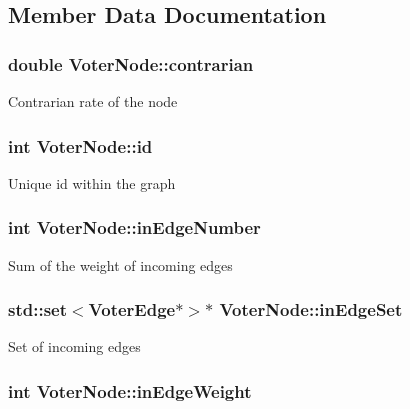 \subsection{Member Data Documentation}
\hypertarget{classVoterNode_ae913afddad8f917f649e406fa1334b25}{
\subsubsection[{contrarian}]{\setlength{\rightskip}{0pt plus 5cm}double Voter\-Node\-::contrarian}}\label{classVoterNode_ae913afddad8f917f649e406fa1334b25}
Contrarian rate of the node \hypertarget{classVoterNode_a93568292fdcb41d849f54f586c598fbc}{
\subsubsection[{id}]{\setlength{\rightskip}{0pt plus 5cm}int Voter\-Node\-::id}}\label{classVoterNode_a93568292fdcb41d849f54f586c598fbc}
Unique id within the graph \hypertarget{classVoterNode_a9bd696aaa21ecf7b01bc877a6eaff534}{
\subsubsection[{in\-Edge\-Number}]{\setlength{\rightskip}{0pt plus 5cm}int Voter\-Node\-::in\-Edge\-Number}}\label{classVoterNode_a9bd696aaa21ecf7b01bc877a6eaff534}
Sum of the weight of incoming edges \hypertarget{classVoterNode_a753832f3c6b57995fce832169250a520}{
\subsubsection[{in\-Edge\-Set}]{\setlength{\rightskip}{0pt plus 5cm}std\-::set$<${\bf Voter\-Edge}$\ast$$>$$\ast$ Voter\-Node\-::in\-Edge\-Set}}\label{classVoterNode_a753832f3c6b57995fce832169250a520}
Set of incoming edges \hypertarget{classVoterNode_a630068d0551e05d9a7bf3eff1f3b1202}{
\subsubsection[{in\-Edge\-Weight}]{\setlength{\rightskip}{0pt plus 5cm}int Voter\-Node\-::in\-Edge\-Weight}}\label{classVoterNode_a630068d0551e05d9a7bf3eff1f3b1202}
